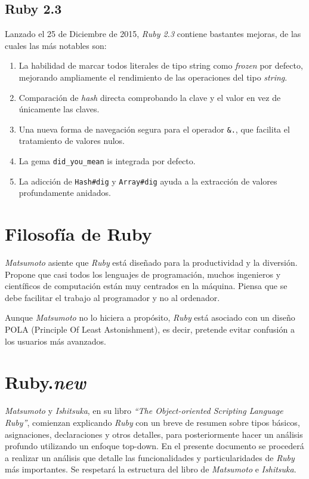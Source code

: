 \subsection{Ruby 2.3}
Lanzado el 25 de Diciembre de 2015, \textit{Ruby 2.3} contiene bastantes mejoras, de las cuales las más notables son:
\begin{enumerate}
\item La habilidad de marcar todos literales de tipo string como \textit{frozen} por defecto, mejorando ampliamente el rendimiento de las operaciones del tipo \textit{string}.
\item Comparación de \textit{hash} directa comprobando la clave y el valor en vez de únicamente las claves.
\item Una nueva forma de navegación segura para el operador \texttt{\&.}, que facilita el tratamiento de valores nulos.
\item La gema \texttt{did\_you\_mean} is integrada por defecto.
\item La adicción de \texttt{Hash\#dig} y \texttt{Array\#dig} ayuda a la extracción de valores profundamente anidados.
\end{enumerate}


\section{Filosofía de Ruby}
\textit{Matsumoto} asiente que \textit{Ruby} está diseñado para la productividad y la diversión. Propone que casi todos los lenguajes de programación, muchos ingenieros y científicos de computación están muy centrados en la máquina. Piensa que se debe facilitar el trabajo al programador y no al ordenador. \par
Aunque \textit{Matsumoto} no lo hiciera a propósito, \textit{Ruby} está asociado con un diseño POLA (Principle Of Least Astonishment), es decir, pretende evitar confusión a los usuarios más avanzados.\cite{Venners2003}

\section{Ruby.\textit{new}}
\textit{Matsumoto} y \textit{Ishitsuka}, en su libro \textit{``The Object-oriented Scripting Language Ruby''}, comienzan explicando \textit{Ruby} con un breve de resumen sobre tipos básicos, asignaciones, declaraciones y otros detalles, para posteriormente hacer un análisis profundo utilizando un enfoque top-down. En el presente documento se procederá a realizar un análisis que detalle las funcionalidades y particularidades de \textit{Ruby} más importantes. Se respetará la estructura del libro de \textit{Matsumoto} e \textit{Ishitsuka}.

